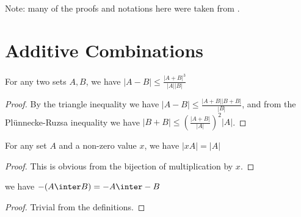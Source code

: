 %

\usepackage[
backend=biber,
style=ieee,
]{biblatex}

Note: many of the proofs and notations here were taken from \cite{8186618}.


\section{Additive Combinations}

\begin{lemma}
    \leanok
    For any two sets $A, B$, we have $|A-B| \leq \frac{|A+B|^3}{|A||B|}$
\end{lemma}

\begin{proof}
    \leanok
    By the triangle inequality we have $|A-B| \leq \frac{|A+B| |B+B|}{|B|}$, and from
    the Plünnecke-Ruzsa inequality we have $|B+B| \leq (\frac{|A+B|}{|A|})^2 |A|$.
\end{proof}

\begin{lemma}
    \leanok
    For any set $A$ and a non-zero value $x$, we have $|xA| = |A|$
\end{lemma}

\begin{proof}
    \leanok
    This is obvious from the bijection of multiplication by $x$.
\end{proof}

\begin{lemma}
    \leanok
    we have $-(A \inter B) = -A \inter -B$
\end{lemma}

\begin{proof}
    \leanok
    Trivial from the definitions.
\end{proof}

